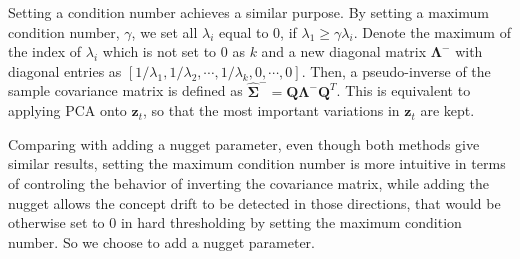 \documentclass[twoside,11pt]{article}
\begin{document}
Setting a condition number achieves a similar purpose. By setting a maximum condition number, $ \gamma$, we set all $ \lambda_i$ equal to $0$, if $ \lambda_1 \geq \gamma \lambda_i$. Denote the maximum of the index of $ \lambda_i$ which is not set to $0$ as $k$ and a new diagonal matrix $\bm { \Lambda} ^{-}$ with diagonal entries as $[1/\lambda_1,1/\lambda_2, \cdots, 1/\lambda_k, 0, \cdots, 0]$. Then, a pseudo-inverse of the sample covariance matrix is defined as $\hat {\bm { \Sigma}} ^{-} = \bm {Q}\bm { \Lambda}^{-}\bm {Q}^T$. This is equivalent to applying PCA onto $\bm {z}_t$, so that the most important variations in $\bm {z}_t$ are kept. 

Comparing with adding a nugget parameter, even though both methods give similar results, setting the maximum condition number is more intuitive in terms of controling the behavior of inverting the covariance matrix, while adding the nugget allows the concept drift to be detected in those directions, that would be otherwise set to $0$ in hard thresholding by setting the maximum condition number. So we choose to add a nugget parameter.
\end{document}
